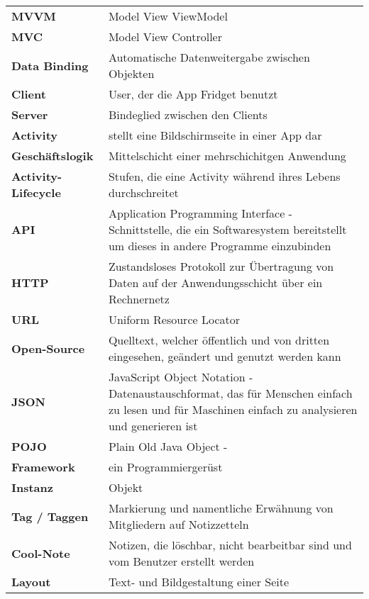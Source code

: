 \begin{table}[h!]
			\centering
			\label{my-label}
			\begin{tabular}{p{4cm}p{10cm}}
				\textbf{MVVM} & Model View ViewModel  \\
				\textbf{MVC} & Model View Controller  \\
				\textbf{Data Binding} & Automatische Datenweitergabe zwischen Objekten  \\
				\textbf{Client} & User, der die App Fridget benutzt   \\
				
				\textbf{Server} & Bindeglied zwischen den Clients   \\
				\textbf{Activity} & stellt eine Bildschirmseite in einer App dar   \\
				\textbf{Geschäftslogik} & Mittelschicht einer mehrschichitgen Anwendung  \\
				\textbf{Activity-Lifecycle}& Stufen, die eine Activity während ihres Lebens durchschreitet   \\
				
				\textbf{API} & Application Programming Interface - Schnittstelle, die ein Softwaresystem bereitstellt um dieses in andere Programme einzubinden  \\
				
			
				\textbf{HTTP} & Zustandsloses Protokoll zur Übertragung von Daten auf der Anwendungsschicht über ein Rechnernetz  \\
				\textbf{URL} & Uniform Resource Locator  \\
				\textbf{Open-Source} & Quelltext, welcher öffentlich und von dritten eingesehen, geändert und genutzt werden kann  \\
				
				\textbf{JSON} & JavaScript Object Notation - Datenaustauschformat, das für Menschen einfach zu lesen und für Maschinen einfach zu analysieren und generieren ist   \\
				\textbf{POJO} & Plain Old Java Object  -   \\
				\textbf{Framework} & ein Programmiergerüst \\
				
				\textbf{Instanz} & Objekt  \\
				\textbf{Tag / Taggen} &  Markierung und namentliche Erwähnung von Mitgliedern auf Notizzetteln   \\

				\textbf{Cool-Note} & Notizen, die löschbar, nicht bearbeitbar sind und vom Benutzer erstellt werden   \\
				\textbf{Layout} & Text- und Bildgestaltung einer Seite  \\
				

\end{tabular}
\end{table}
